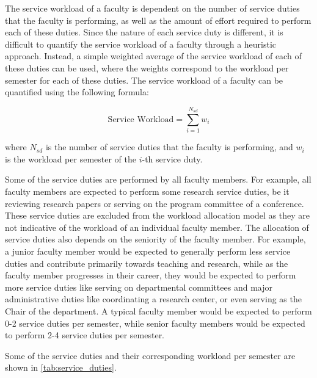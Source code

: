 The service workload of a faculty is dependent on the number of service duties that the faculty is performing, as well as the amount of effort required to perform each of these duties. Since the nature of each service duty is different, it is difficult to quantify the service workload of a faculty through a heuristic approach. Instead, a simple weighted average of the service workload of each of these duties can be used, where the weights correspond to the workload per semester for each of these duties. The service workload of a faculty can be quantified using the following formula:

\begin{equation*}
  \text{Service Workload} = \sum_{i=1}^{N_{sd}} w_i
\end{equation*}

where $N_{sd}$ is the number of service duties that the faculty is performing, and $w_i$ is the workload per semester of the $i$-th service duty.

Some of the service duties are performed by all faculty members. For example, all faculty members are expected to perform some research service duties, be it reviewing research papers or serving on the program committee of a conference. These service duties are excluded from the workload allocation model as they are not indicative of the workload of an individual faculty member. The allocation of service duties also depends on the seniority of the faculty member. For example, a junior faculty member would be expected to generally perform less service duties and contribute primarily towards teaching and research, while as the faculty member progresses in their career, they would be expected to perform more service duties like serving on departmental committees and major administrative duties like coordinating a research center, or even serving as the Chair of the department. A typical faculty member would be expected to perform 0-2 service duties per semester, while senior faculty members would be expected to perform 2-4 service duties per semester.

Some of the service duties and their corresponding workload per semester are shown in \autoref{tab:service_duties}.

